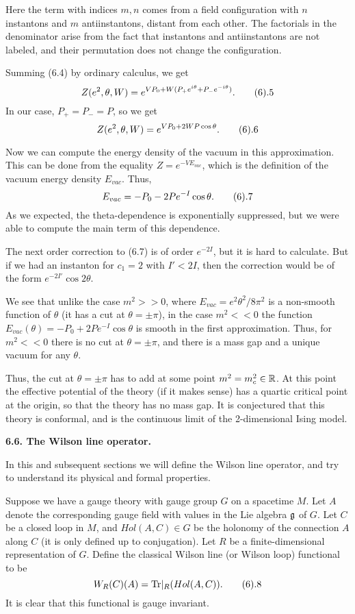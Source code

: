 Here the term with indices $m,n$ comes from a field configuration 
with $n$ instantons and $m$ antiinstantons, distant from each other. 
The factorials in the denominator arise from the fact that instantons 
and antiinstantons are not labeled, and their permutation does not change
the configuration.  

Summing (6.4) by ordinary calculus, we get
$$
Z(e^2,\theta,W)=e^{VP_0+W(P_+e^{i\theta}+P_-e^{-i\theta})}.\tag 6.5
$$
In our case, $P_+=P_-=P$, so we get
$$
Z(e^2,\theta,W)=e^{VP_0+2WP\cos\theta}.\tag 6.6
$$

Now we can compute the energy density of the vacuum in this approximation. 
This can be done from the equality $Z=e^{-VE_{vac}}$, which is 
the definition of the vacuum energy density $E_{vac}$. Thus, 
$$
E_{vac}=-P_0-2Pe^{-I}\cos\theta.\tag 6.7
$$
As we expected, the theta-dependence is exponentially suppressed, but we were 
able to compute the main term of this dependence. 

The next order correction to (6.7) is of order $e^{-2I}$, but it 
is hard to calculate. But if we had an instanton for $c_1=2$ with
$I'<2I$, then the correction would be of the form $e^{-2I'}\cos 2\theta$.  

We see that unlike the case $m^2>>0$, where $E_{vac}=e^2\theta^2/8\pi^2$
is a non-smooth function of $\theta$ (it has a cut at $\theta=\pm \pi$), 
in the case $m^2<<0$ the function $E_{vac}(\theta)=-P_0+2Pe^{-I}\cos\theta$
is smooth in the first approximation. Thus, for $m^2<<0$ there is no cut 
at $\theta=\pm \pi$, and there is a mass gap and a unique vacuum for any 
$\theta$. 

Thus, the cut at $\theta=\pm \pi$ has to add at some point $m^2=m^2_c\in \Bbb R$.  
At this point the effective potential of the theory (if it makes sense) 
has a quartic critical point at the origin, so that the theory has no 
mass gap. It is conjectured that this theory is conformal, and is the 
continuous limit of the 2-dimensional Ising model. 

{\bf 6.6. The Wilson line operator.}

In this and subsequent sections we will define the Wilson line operator, 
and try to understand its physical and formal properties. 

Suppose we have a gauge theory with gauge group $G$ on a spacetime $M$. 
Let $A$ denote the corresponding gauge field with values in the Lie algebra 
$\frak g$ of $G$. Let $C$ be a closed loop in $M$, and $Hol(A,C)\in G$ be the 
holonomy of the connection $A$ along $C$ (it is only defined up to 
conjugation). Let $R$ be a finite-dimensional representation of $G$. 
Define the classical Wilson line (or Wilson loop) functional to be
$$
W_R(C)(A)=\Tr|_R(Hol(A,C)).\tag 6.8
$$
It is clear that this functional is gauge invariant. 

